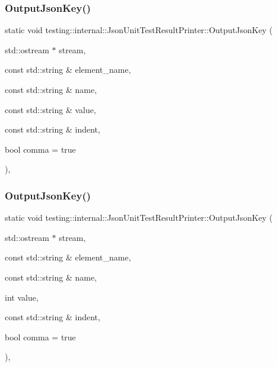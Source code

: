 \mbox{\label{classtesting_1_1internal_1_1_json_unit_test_result_printer_a78cedc9b8afd033a90cd921f65a0f4c5}} 
\subsubsection{\texorpdfstring{OutputJsonKey()}{OutputJsonKey()}\hspace{0.1cm}{\footnotesize\ttfamily [1/6]}}
{\footnotesize\ttfamily static void testing\+::internal\+::\+Json\+Unit\+Test\+Result\+Printer\+::\+Output\+Json\+Key (\begin{DoxyParamCaption}\item[{std\+::ostream $\ast$}]{stream,  }\item[{const std\+::string \&}]{element\+\_\+name,  }\item[{const std\+::string \&}]{name,  }\item[{const std\+::string \&}]{value,  }\item[{const std\+::string \&}]{indent,  }\item[{bool}]{comma = {\ttfamily true} }\end{DoxyParamCaption})\hspace{0.3cm}{\ttfamily [static]}, {\ttfamily [private]}}

\mbox{\label{classtesting_1_1internal_1_1_json_unit_test_result_printer_af7bacb58770f91639ac729c9b26e3f18}} 
\subsubsection{\texorpdfstring{OutputJsonKey()}{OutputJsonKey()}\hspace{0.1cm}{\footnotesize\ttfamily [2/6]}}
{\footnotesize\ttfamily static void testing\+::internal\+::\+Json\+Unit\+Test\+Result\+Printer\+::\+Output\+Json\+Key (\begin{DoxyParamCaption}\item[{std\+::ostream $\ast$}]{stream,  }\item[{const std\+::string \&}]{element\+\_\+name,  }\item[{const std\+::string \&}]{name,  }\item[{int}]{value,  }\item[{const std\+::string \&}]{indent,  }\item[{bool}]{comma = {\ttfamily true} }\end{DoxyParamCaption})\hspace{0.3cm}{\ttfamily [static]}, {\ttfamily [private]}}

